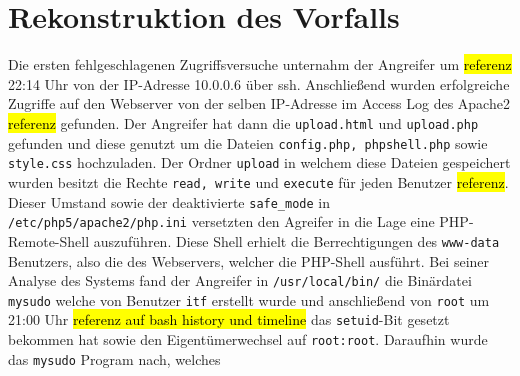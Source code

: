 \section{Rekonstruktion des Vorfalls}
Die ersten fehlgeschlagenen Zugriffsversuche unternahm der Angreifer um \hl{referenz} 22:14 Uhr von der IP-Adresse 10.0.0.6 über ssh.
Anschließend wurden erfolgreiche Zugriffe auf den Webserver von der selben IP-Adresse im Access Log des Apache2 \hl{referenz} gefunden.
Der Angreifer hat dann die \texttt{upload.html} und \texttt{upload.php} gefunden und diese genutzt um die Dateien \texttt{config.php, phpshell.php} sowie \texttt{style.css} hochzuladen. Der Ordner \texttt{upload} in welchem diese Dateien gespeichert wurden besitzt die Rechte \texttt{read, write} und \texttt{execute} für jeden Benutzer \hl{referenz}. 
Dieser Umstand sowie der deaktivierte \texttt{safe\_mode} in \texttt{/etc/php5/apache2/php.ini} versetzten den Agreifer in die Lage eine PHP-Remote-Shell auszuführen.
Diese Shell erhielt die Berrechtigungen des \texttt{www-data} Benutzers, also die des Webservers, welcher die PHP-Shell ausführt.
Bei seiner Analyse des Systems fand der Angreifer in \texttt{/usr/local/bin/} die Binärdatei \texttt{mysudo} welche von Benutzer \texttt{itf} erstellt wurde und anschließend von \texttt{root} um 21:00 Uhr \hl{referenz auf bash history und timeline} das \texttt{setuid}-Bit gesetzt bekommen hat sowie den Eigentümerwechsel auf \texttt{root:root}.
Daraufhin wurde das \texttt{mysudo} Program nach, welches \\

